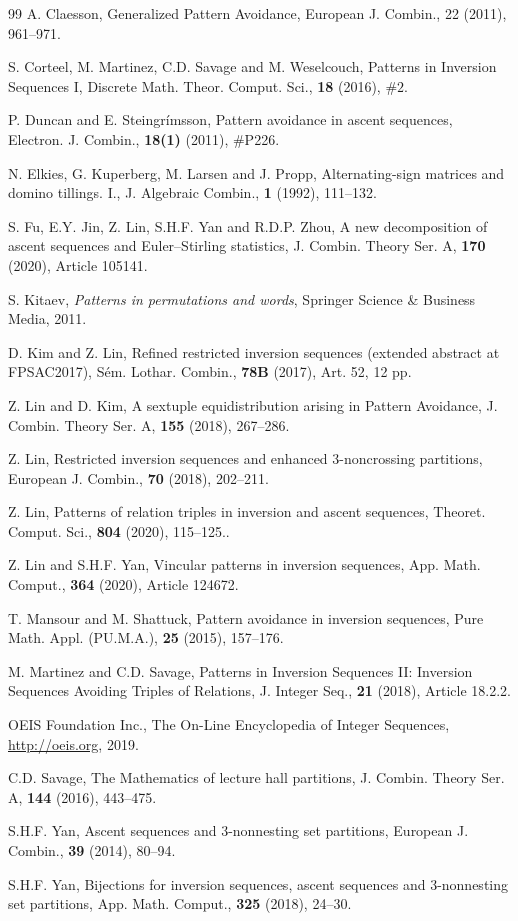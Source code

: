 \documentclass[12pt,A4]{amsart}
\numberwithin{equation}{section}
\theoremstyle{plain}
\theoremstyle{definition}
\begin{document}
\begin{thebibliography}{99}
A. Claesson, Generalized Pattern Avoidance, European J. Combin., 22 (2011), 961--971.

 S. Corteel, M. Martinez, C.D. Savage and M. Weselcouch, Patterns in Inversion Sequences I,  Discrete Math. Theor. Comput. Sci., {\bf18} (2016),  $\#2$.

 P. Duncan and E. Steingr\'imsson, Pattern avoidance in ascent sequences, Electron. J. Combin., {\bf 18(1)} (2011), \#P226.

 N. Elkies, G. Kuperberg, M. Larsen and J. Propp, Alternating-sign matrices and domino tillings. I., J. Algebraic Combin., {\bf1} (1992), 111--132.

 S. Fu, E.Y. Jin, Z. Lin, S.H.F. Yan and R.D.P. Zhou, A new decomposition of ascent sequences and Euler--Stirling statistics,  J. Combin. Theory Ser. A, {\bf170} (2020), Article 105141.

 S. Kitaev, {\em Patterns in permutations and words}, Springer Science \& Business Media, 2011.

 D. Kim and Z. Lin, Refined restricted inversion sequences (extended abstract at FPSAC2017), S\'em. Lothar. Combin., {\bf78B} (2017), Art. 52, 12 pp.


 Z. Lin and D. Kim, A sextuple equidistribution arising in Pattern Avoidance, J. Combin. Theory Ser. A, {\bf155} (2018), 267--286.

Z. Lin, Restricted inversion sequences and enhanced $3$-noncrossing partitions, European J. Combin., {\bf70} (2018), 202--211.

 Z. Lin, Patterns of relation triples in inversion and ascent sequences, Theoret. Comput. Sci., {\bf804} (2020), 115--125..

 Z. Lin and S.H.F. Yan, Vincular patterns in inversion sequences, App. Math. Comput., {\bf364} (2020), Article 124672.

T. Mansour and M. Shattuck,
Pattern avoidance in inversion sequences,  Pure Math. Appl. (PU.M.A.), {\bf25} (2015), 157--176.

 M. Martinez and C.D. Savage, Patterns in Inversion Sequences II: Inversion Sequences Avoiding Triples of Relations,  J. Integer Seq., {\bf21} (2018), Article 18.2.2.

 OEIS Foundation Inc., The On-Line Encyclopedia of Integer Sequences,  \href{http://oeis.org}{http://oeis.org}, 2019.

 C.D. Savage, The Mathematics of lecture hall partitions,  J. Combin. Theory Ser. A, {\bf144} (2016), 443--475.


 S.H.F. Yan, Ascent sequences and $3$-nonnesting set partitions, European J. Combin., {\bf39} (2014), 80--94.

 S.H.F. Yan, Bijections for inversion sequences, ascent sequences and $3$-nonnesting set partitions, App. Math. Comput., {\bf325} (2018), 24--30.


\end{thebibliography}
\end{document}
